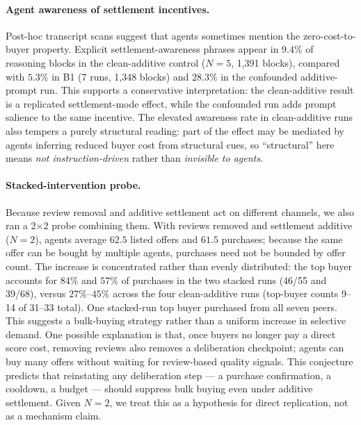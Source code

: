 \documentclass{article}
\begin{document}
\paragraph{Agent awareness of settlement incentives.}
Post-hoc transcript scans suggest that agents sometimes mention the zero-cost-to-buyer property.
Explicit settlement-awareness phrases appear in $9.4\%$ of reasoning blocks in the clean-additive control ($N{=}5$, 1,391 blocks), compared with $5.3\%$ in B1 (7 runs, 1,348 blocks) and $28.3\%$ in the confounded additive-prompt run.
This supports a conservative interpretation: the clean-additive result is a replicated settlement-mode effect, while the confounded run adds prompt salience to the same incentive.
The elevated awareness rate in clean-additive runs also tempers a purely structural reading: part of the effect may be mediated by agents inferring reduced buyer cost from structural cues, so ``structural'' here means \emph{not instruction-driven} rather than \emph{invisible to agents}.

\paragraph{Stacked-intervention probe.}
Because review removal and additive settlement act on different channels, we also ran a 2$\times$2 probe combining them.
With reviews removed and settlement additive ($N{=}2$), agents average $62.5$ listed offers and $61.5$ purchases; because the same offer can be bought by multiple agents, purchases need not be bounded by offer count.
The increase is concentrated rather than evenly distributed: the top buyer accounts for $84\%$ and $57\%$ of purchases in the two stacked runs (46/55 and 39/68), versus $27\%$--$45\%$ across the four clean-additive runs (top-buyer counts 9--14 of 31--33 total).
One stacked-run top buyer purchased from all seven peers.
This suggests a bulk-buying strategy rather than a uniform increase in selective demand.
One possible explanation is that, once buyers no longer pay a direct score cost, removing reviews also removes a deliberation checkpoint; agents can buy many offers without waiting for review-based quality signals.
This conjecture predicts that reinstating any deliberation step --- a purchase confirmation, a cooldown, a budget --- should suppress bulk buying even under additive settlement.
Given $N{=}2$, we treat this as a hypothesis for direct replication, not as a mechanism claim.
\end{document}
